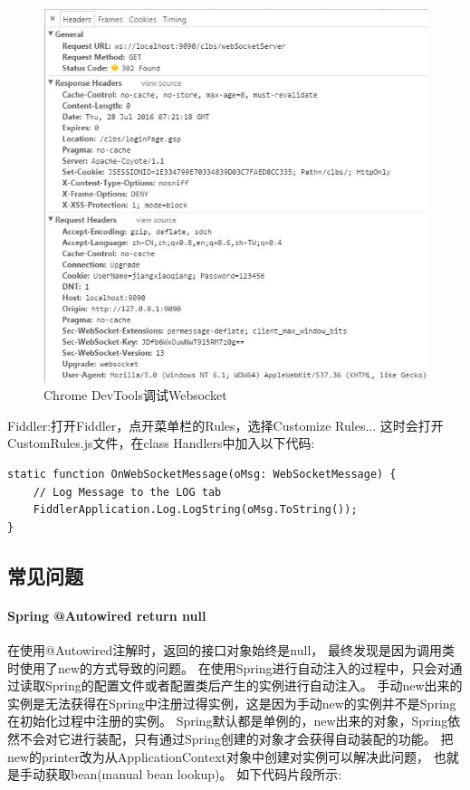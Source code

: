 \documentclass{book}
\begin{document}
\begin{figure}[htbp]
	\centering
	\includegraphics[scale=0.6]{ChromeWebsocketDebugger.jpg}
	\caption{Chrome DevTools调试Websocket}
	\label{fig:ChromeWebsocketDebugger}
\end{figure}

Fiddler:打开Fiddler，点开菜单栏的Rules，选择Customize Rules...
这时会打开CustomRules.js文件，在class Handlers中加入以下代码:

\begin{lstlisting}[language={[Sharp]C}]
static function OnWebSocketMessage(oMsg: WebSocketMessage) {
	// Log Message to the LOG tab
	FiddlerApplication.Log.LogString(oMsg.ToString());
}
\end{lstlisting}

\subsection{常见问题}

\paragraph{Spring @Autowired return null}

在使用@Autowired注解时，返回的接口对象始终是null，
最终发现是因为调用类时使用了new的方式导致的问题。
在使用Spring进行自动注入的过程中，只会对通过读取Spring的配置文件或者配置类后产生的实例进行自动注入。
手动new出来的实例是无法获得在Spring中注册过得实例，这是因为手动new的实例并不是Spring在初始化过程中注册的实例。
Spring默认都是单例的，new出来的对象，Spring依然不会对它进行装配，只有通过Spring创建的对象才会获得自动装配的功能。
把new的printer改为从ApplicationContext对象中创建对实例可以解决此问题，
也就是手动获取bean(manual bean lookup)。
如下代码片段所示:
\end{document}
